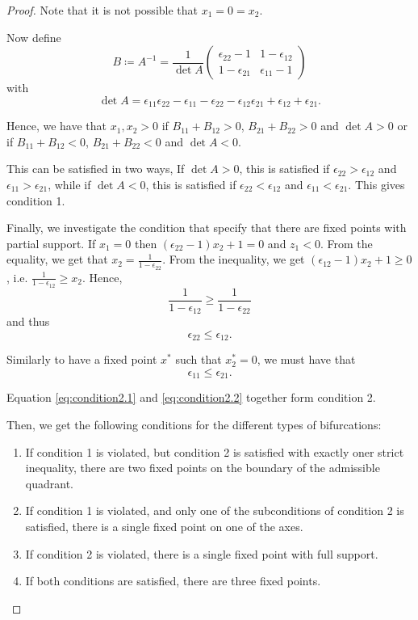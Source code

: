 \documentclass{article} %
\newcounter{ct}
\theoremstyle{definition}
\theoremstyle{remark}
\begin{document}
\begin{proof}
Note that it is not possible that $x_1=0=x_2$.

Now define
\[
B\coloneqq A^{-1} = \frac{1}{\det A}
\begin{pmatrix}
\epsilon_{22}-1  &  1-\epsilon_{12} \\
1-\epsilon_{21}  &  \epsilon_{11}-1
\end{pmatrix}
\]
with \[\det A = \epsilon_{11}\epsilon_{22}-\epsilon_{11}-\epsilon_{22}-\epsilon_{12}\epsilon_{21}+\epsilon_{12}+\epsilon_{21}.\]

Hence, we have that $x_1,x_2>0$ if $B_{11}+B_{12}>0$, $B_{21}+B_{22}>0$ and $\det A >0$ 
or if $B_{11}+B_{12}<0$, $B_{21}+B_{22}<0$ and $\det A <0$.

This can be satisfied in two ways, 
If $\det A >0$, this is satisfied if $\epsilon_{22}>\epsilon_{12}$ and $\epsilon_{11}>\epsilon_{21}$,
while if $\det A <0$, this is satisfied if $\epsilon_{22}<\epsilon_{12}$ and $\epsilon_{11}<\epsilon_{21}$.
This gives condition 1. %



Finally, we investigate the condition that specify that there are fixed points with partial support.
If $x_1=0$ then $(\epsilon_{22}-1)x_2+1=0$ and $z_1<0$. 
From the equality, we get that $x_{2}=\frac{1}{1-\epsilon_{22}}$.
From the inequality, we get  $(\epsilon_{12}-1)x_2+1\geq 0$, i.e. $\frac{1}{1-\epsilon_{12}}\geq x_2$.
Hence, 
\begin{equation*}
\frac{1}{1-\epsilon_{12}}\geq\frac{1}{1-\epsilon_{22}}
\end{equation*}
and thus
\begin{equation}\label{eq:condition2.1}
\epsilon_{22} \leq \epsilon_{12}.
\end{equation}

Similarly to have a fixed point $x^*$ such that $x_2^*=0$, we must have that 
\begin{equation}\label{eq:condition2.2}
\epsilon_{11} \leq \epsilon_{21}.
\end{equation}

Equation \ref{eq:condition2.1} and \ref{eq:condition2.2} together form condition 2.


Then, we get the following conditions for the different types of bifurcations:
\begin{enumerate}
\item  If condition 1 is violated, but condition 2 is satisfied with exactly oner strict inequality, there are two fixed points on the boundary of the admissible quadrant.
\item If condition 1 is violated, and only one of the subconditions of condition 2 is satisfied, there is a single fixed point on one of the axes.
\item If condition 2 is violated, there is a single fixed point with full support.
\item If both conditions are satisfied, there are three fixed points.
\end{enumerate}



\end{proof}
\end{document}
